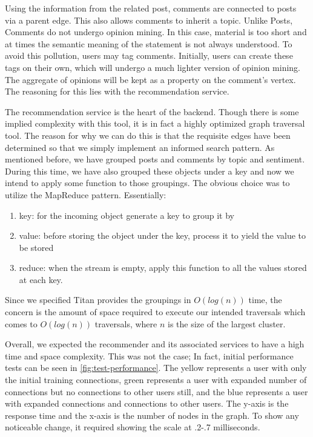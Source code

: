 \documentclass[11pt,letterpaper]{article}
\begin{document}
Using the information from the related post, comments are connected to posts via a parent edge. This also allows comments to inherit a topic. Unlike Posts, Comments do not undergo opinion mining. In this case, material is too short and at times the semantic meaning of the statement is not always understood. To avoid this pollution, users may tag comments. Initially, users can create these tags on their own, which will undergo a much lighter version of opinion mining. The aggregate of opinions will be kept as a property on the comment's vertex. The reasoning for this lies with the recommendation service.

The recommendation service is the heart of the backend. Though there is some implied complexity with this tool, it is in fact a highly optimized graph traversal tool. The reason for why we can do this is that the requisite edges have been determined so that we simply implement an informed search pattern. As mentioned before, we have grouped posts and comments by topic and sentiment. During this time, we have also grouped these objects under a key and now we intend to apply some function to those groupings. The obvious choice was to utilize the MapReduce pattern. Essentially:
\begin{enumerate}
    \item key: for the incoming object generate a key to group it by
	\item value: before storing the object under the key, process it to yield the value to be stored
	\item reduce: when the stream is empty, apply this function to all the values stored at each key.
\end{enumerate} 
Since we specified Titan provides the groupings in $O(log(n))$ time, the concern is the amount of space required to execute our intended traversals which comes to $O(log(n))$ traversals, where $n$ is the size of the largest cluster.

Overall, we expected the recommender and its associated services to have a high time and space complexity. This was not the case; In fact, initial performance tests can be seen in \ref{fig:test-performance}. The yellow represents a user with only the initial training connections, green represents a user with expanded number of connections but no connections to other users still, and the blue represents a user with expanded connections and connections to other users. The y-axis is the response time and the x-axis is the number of nodes in the graph. To show any noticeable change, it required showing the scale at .2-.7 milliseconds. 
\end{document}
